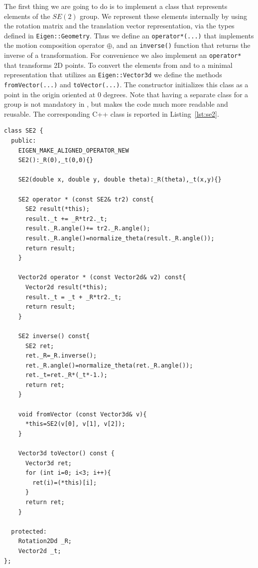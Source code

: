 \documentclass[a4paper]{article}
\begin{document}
The first thing we are going to do is to implement a class that
represents elements of the $SE(2)$ group. We represent these elements
internally by using the rotation matrix and the translation vector
representation, via the types defined in \verb+Eigen::Geometry+.  Thus
we define an \verb+operator*(...)+ that implements the motion composition
operator $\oplus$, and an \verb+inverse()+ function that returns the inverse of
a transformation. For convenience we also implement an
\verb+operator*+ that transforms 2D points. To convert the elements
from and to a minimal representation that utilizes an \verb+Eigen::Vector3d+
we define the methods \verb+fromVector(...)+ and \verb+toVector(...)+.
The constructor initializes this class as a point in the origin
oriented at 0 degrees.  Note that having a separate class for a group
is not mandatory in \gopt, but makes the code much more readable and
reusable. The corresponding C++ class is reported in
Listing~\ref{lst:se2}.
\begin{lstlisting}[float,label=lst:se2,caption=\text{Helper class to represent $SE(2)$}.]
class SE2 {
  public:
    EIGEN_MAKE_ALIGNED_OPERATOR_NEW
    SE2():_R(0),_t(0,0){}

    SE2(double x, double y, double theta):_R(theta),_t(x,y){}

    SE2 operator * (const SE2& tr2) const{
      SE2 result(*this);
      result._t += _R*tr2._t;
      result._R.angle()+= tr2._R.angle();
      result._R.angle()=normalize_theta(result._R.angle());
      return result;
    }

    Vector2d operator * (const Vector2d& v2) const{
      Vector2d result(*this);
      result._t = _t + _R*tr2._t;
      return result;
    }

    SE2 inverse() const{
      SE2 ret;
      ret._R=_R.inverse();
      ret._R.angle()=normalize_theta(ret._R.angle());
      ret._t=ret._R*(_t*-1.);
      return ret;
    }

    void fromVector (const Vector3d& v){
      *this=SE2(v[0], v[1], v[2]);
    }

    Vector3d toVector() const {
      Vector3d ret;
      for (int i=0; i<3; i++){
        ret(i)=(*this)[i];
      }
      return ret;
    }

  protected:
    Rotation2Dd _R;
    Vector2d _t;
};
\end{lstlisting}
\end{document}
